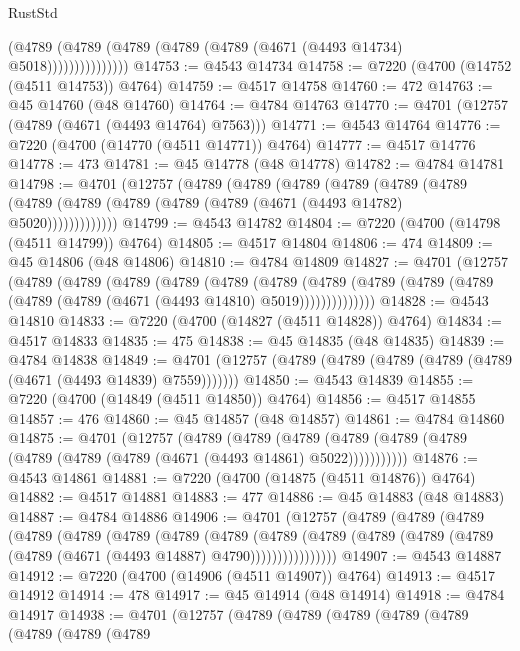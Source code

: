 \begin{lexlean}{RustStd}
\begin{coremodule}
                      (@4789 (@4789 (@4789 (@4789 (@4789 (@4671 (@4493 @14734) @5018)))))))))))))))
@14753 := @4543 @14734
@14758 := @7220 (@4700 (@14752 (@4511 @14753)) @4764)
@14759 := @4517 @14758
@14760 := 472
@14763 := @45 @14760 (@48 @14760)
@14764 := @4784 @14763
@14770 := @4701 (@12757 (@4789 (@4671 (@4493 @14764) @7563)))
@14771 := @4543 @14764
@14776 := @7220 (@4700 (@14770 (@4511 @14771)) @4764)
@14777 := @4517 @14776
@14778 := 473
@14781 := @45 @14778 (@48 @14778)
@14782 := @4784 @14781
@14798 := @4701
    (@12757
      (@4789
        (@4789
          (@4789
            (@4789
              (@4789
                (@4789 (@4789 (@4789 (@4789 (@4789 (@4789 (@4671 (@4493 @14782) @5020)))))))))))))
@14799 := @4543 @14782
@14804 := @7220 (@4700 (@14798 (@4511 @14799)) @4764)
@14805 := @4517 @14804
@14806 := 474
@14809 := @45 @14806 (@48 @14806)
@14810 := @4784 @14809
@14827 := @4701
    (@12757
      (@4789
        (@4789
          (@4789
            (@4789
              (@4789
                (@4789
                  (@4789
                    (@4789 (@4789 (@4789 (@4789 (@4789 (@4671 (@4493 @14810) @5019))))))))))))))
@14828 := @4543 @14810
@14833 := @7220 (@4700 (@14827 (@4511 @14828)) @4764)
@14834 := @4517 @14833
@14835 := 475
@14838 := @45 @14835 (@48 @14835)
@14839 := @4784 @14838
@14849 := @4701 (@12757 (@4789 (@4789 (@4789 (@4789 (@4789 (@4671 (@4493 @14839) @7559)))))))
@14850 := @4543 @14839
@14855 := @7220 (@4700 (@14849 (@4511 @14850)) @4764)
@14856 := @4517 @14855
@14857 := 476
@14860 := @45 @14857 (@48 @14857)
@14861 := @4784 @14860
@14875 := @4701
    (@12757
      (@4789
        (@4789
          (@4789 (@4789 (@4789 (@4789 (@4789 (@4789 (@4789 (@4671 (@4493 @14861) @5022)))))))))))
@14876 := @4543 @14861
@14881 := @7220 (@4700 (@14875 (@4511 @14876)) @4764)
@14882 := @4517 @14881
@14883 := 477
@14886 := @45 @14883 (@48 @14883)
@14887 := @4784 @14886
@14906 := @4701
    (@12757
      (@4789
        (@4789
          (@4789
            (@4789
              (@4789
                (@4789
                  (@4789
                    (@4789
                      (@4789
                        (@4789
                          (@4789 (@4789 (@4789 (@4789 (@4671 (@4493 @14887) @4790))))))))))))))))
@14907 := @4543 @14887
@14912 := @7220 (@4700 (@14906 (@4511 @14907)) @4764)
@14913 := @4517 @14912
@14914 := 478
@14917 := @45 @14914 (@48 @14914)
@14918 := @4784 @14917
@14938 := @4701
    (@12757
      (@4789
        (@4789
          (@4789
            (@4789
              (@4789
                (@4789
                  (@4789
                    (@4789

\end{coremodule}
\end{lexlean}
